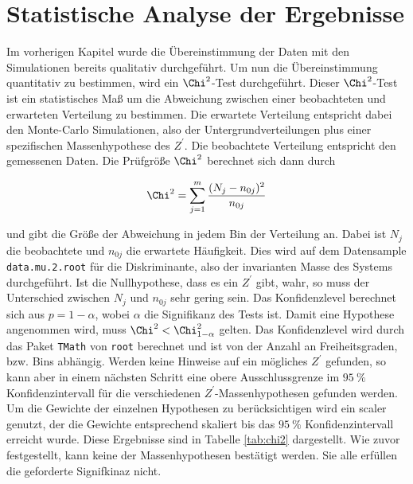 \section{Statistische Analyse der Ergebnisse}
\label{sec:chi}

Im vorherigen Kapitel wurde die Übereinstimmung der Daten mit den Simulationen bereits qualitativ durchgeführt.
Um nun die Übereinstimmung quantitativ zu bestimmen, wird ein $\Chi^2$-Test durchgeführt.
Dieser $\Chi^2$-Test ist ein statistisches Maß um die Abweichung zwischen einer beobachteten und erwarteten Verteilung zu bestimmen.
Die erwartete Verteilung entspricht dabei den Monte-Carlo Simulationen, also der Untergrundverteilungen plus einer spezifischen Massenhypothese des $Z^\prime$.
Die beobachtete Verteilung entspricht den gemessenen Daten.
Die Prüfgröße $\Chi^2$ berechnet sich dann durch

\begin{equation}
  \Chi^2 = \sum_{j=1}^m \frac{(N_j - n_{0j})^2}{n_{0j}}
\end{equation}

und gibt die Größe der Abweichung in jedem Bin der Verteilung an.
Dabei ist $N_j$ die beobachtete und $n_{0j}$ die erwartete Häufigkeit.
Dies wird auf dem Datensample \texttt{data.mu.2.root} für die Diskriminante, also der invarianten Masse des Systems durchgeführt.
Ist die Nullhypothese, dass es ein $Z^\prime$ gibt, wahr, so muss der Unterschied zwischen $N_j$ und $n_{0j}$ sehr gering sein.
Das Konfidenzlevel berechnet sich aus $p = 1 - \alpha$, wobei $\alpha$ die Signifikanz des Tests ist.
Damit eine Hypothese angenommen wird, muss $\Chi^2 < \Chi^2_{1-\alpha}$ gelten.
Das Konfidenzlevel wird durch das Paket \texttt{TMath} von \texttt{root} berechnet und ist von der Anzahl an Freiheitsgraden, bzw. Bins abhängig.
Werden keine Hinweise auf ein mögliches $Z^\prime$ gefunden, so kann aber in einem nächsten Schritt eine obere Ausschlussgrenze im $\SI{95}{\percent}$ Konfidenzintervall für die verschiedenen $Z^\prime$-Massenhypothesen gefunden werden.
Um die Gewichte der einzelnen Hypothesen zu berücksichtigen wird ein scaler genutzt, der die Gewichte entsprechend skaliert bis das $\SI{95}{\percent}$ Konfidenzintervall erreicht wurde.
Diese Ergebnisse sind in Tabelle \ref{tab:chi2} dargestellt.
Wie zuvor festgestellt, kann keine der Massenhypothesen bestätigt werden.
Sie alle erfüllen die geforderte Signifkinaz nicht.

